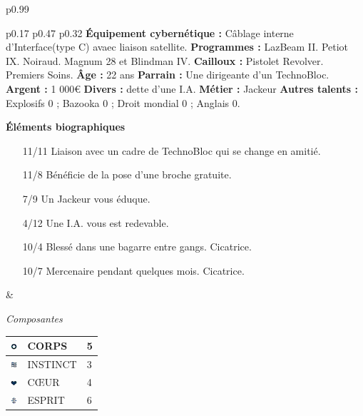 \documentclass[11pt,twoside,a4paper]{article}
\def\imgCORPS{\includegraphics[width=0.25cm]{../../../../../imgGraphics/rolePlayingGame/SimulacreS/mini12x12/corps.png} }
\def\imgINSTI{\includegraphics[width=0.25cm]{../../../../../imgGraphics/rolePlayingGame/SimulacreS/mini12x12/instinct.png} }
\def\imgCOEUR{\includegraphics[width=0.25cm]{../../../../../imgGraphics/rolePlayingGame/SimulacreS/mini12x12/coeur.png} }
\def\imgESPRI{\includegraphics[width=0.25cm]{../../../../../imgGraphics/rolePlayingGame/SimulacreS/mini12x12/esprit.png} }
\begin{document}
\begin{longtable}[ht]{ p{} }
\begin{tabular}[h]{ p{} p{} p{} }
		\textbf{{\'E}quipement cybern{\'e}tique : }C{\^a}blage interne d'Interface(type C) avaec liaison satellite. \newline
		\textbf{Programmes : }LazBeam II. Petiot IX. Noiraud. Magnum 28 et Blindman IV. \newline
		\textbf{Cailloux : }Pistolet Revolver. Premiers Soins. \newline
		\textbf{{\^A}ge : } 22 ans 											\newline
		\textbf{Parrain : } Une dirigeante d'un TechnoBloc. 				\newline
		\textbf{Argent : } 1 000\euro 										\newline
		\textbf{Divers : } dette d'une I.A.									\newline
		\textbf{M{\'e}tier : } Jackeur 										\newline
		\textbf{Autres talents : } Explosifs 0 ; Bazooka 0 ; Droit mondial 0 ; Anglais 0. \newline
		
		\textbf{{\'E}l{\'e}ments biographiques}
		\begin{itemize}
			\item[11/11] Liaison avec un cadre de TechnoBloc qui se change en amiti{\'e}. 
			\item[11/8] B{\'e}n{\'e}ficie de la pose d'une broche gratuite. 
			\item[7/9] Un Jackeur vous {\'e}duque. 
			\item[4/12] Une I.A. vous est redevable. 
			\item[10/4] Bless{\'e} dans une bagarre entre gangs. Cicatrice. 
			\item[10/7] Mercenaire pendant quelques mois. Cicatrice. 
		\end{itemize}
		
		& %
		
			{\centering \emph{Composantes}}	\newline
				{\footnotesize %
				\begin{tabular}[h]{|p{0.25cm}|p{3.00cm}|p{0.75cm}|}
					\hline
					\imgCORPS & CORPS		&	5	\\
					\hline
					\imgINSTI & INSTINCT	&	3	\\
					\hline
					\imgCOEUR & C\OE UR		&	4	\\
					\hline
					\imgESPRI & ESPRIT		&	6	\\
					\hline
				\end{tabular} }
			\newline
			

\end{tabular}
\end{longtable}
\end{document}

